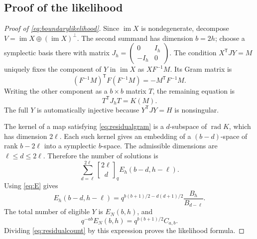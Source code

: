 \documentclass[11pt]{article}
\numberwithin{equation}{section}
\theoremstyle{definition}
\theoremstyle{remark}
\newcommand{\rad}{\operatorname{rad}}
\newcommand{\im}{\operatorname{im}}
\newcommand{\tr}{\mathsf T}
\newcommand{\qbin}[2]{\genfrac{[}{]}{0pt}{}{#1}{#2}_{q}}
\begin{document}
\subsection{Proof of the likelihood}
\begin{proof}[Proof of \eqref{eq:boundarylikelihood}]
Since $\im X$ is nondegenerate, decompose $V=\im X\oplus(\im X)^\perp$. The second summand has dimension $b=2h$; choose a symplectic basis there with matrix $J_h=\left(\begin{smallmatrix}0&I_h\\-I_h&0\end{smallmatrix}\right)$. The condition $X^\tr JY=M$ uniquely fixes the component of $Y$ in $\im X$ as $XF^{-1}M$. Its Gram matrix is
\[
 (F^{-1}M)^\tr F(F^{-1}M)=-M^\tr F^{-1}M.
\]
Writing the other component as a $b\times b$ matrix $T$, the remaining equation is
\begin{equation}\label{eq:residualgram}
 T^\tr J_hT=K(M).
\end{equation}
The full $Y$ is automatically injective because $Y^\tr JY=H$ is nonsingular.

The kernel of a map satisfying \eqref{eq:residualgram} is a $d$-subspace of $\rad K$, which has dimension $2\ell$. Each such kernel gives an embedding of a $(b-d)$-space of rank $b-2\ell$ into a symplectic $b$-space. The admissible dimensions are $\ell\le d\le2\ell$. Therefore the number of solutions is
\begin{equation}\label{eq:residualcount}
 \sum_{d=\ell}^{2\ell}\qbin{2\ell}d E_h(b-d,h-\ell).
\end{equation}
Using \eqref{eq:E} gives
\[
 E_h(b-d,h-\ell)
 =q^{b(b+1)/2-d(d+1)/2}\frac{B_h}{B_{d-\ell}}.
\]
The total number of eligible $Y$ is $E_N(b,h)$, and
\[
 q^{-ab}E_N(b,h)=q^{b(b+1)/2}C_{a,b}.
\]
Dividing \eqref{eq:residualcount} by this expression proves the likelihood formula.
\end{proof}
\end{document}

